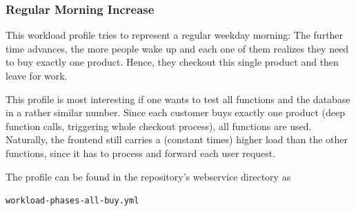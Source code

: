 \documentclass[../main.tex]{subfiles}
\begin{document}
\subsubsection{Regular Morning Increase}%
\label{ssub:webshopProfileRegularMorning}

This workload profile tries to represent a regular weekday morning: 
The further time advances, the more people wake up and each one of them realizes they need to buy exactly one product.
Hence, they checkout this single product and then leave for work.

This profile is most interesting if one wants to test all functions and the database in a rather similar number.
Since each customer buys exactly one product (deep function calls, triggering whole checkout process),
all functions are used. 
Naturally, the frontend still carries a (constant times) higher load than the other functions, 
since it has to process and forward each user request.

The profile can be found in the repository's webservice directory as 
\begin{tcolorbox}
\quad\texttt{workload-phases-all-buy.yml}
\end{tcolorbox}
\end{document}
